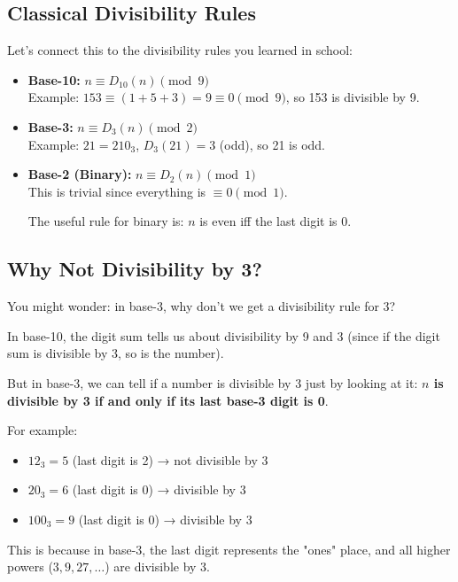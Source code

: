 \subsection{Classical Divisibility Rules}
\label{subsec:classical-rules}

Let's connect this to the divisibility rules you learned in school:

\begin{keyidea}
\begin{itemize}
\item \textbf{Base-10:} $n \equiv D_{10}(n) \pmod{9}$ \\
Example: $153 \equiv (1+5+3) = 9 \equiv 0 \pmod{9}$, so 153 is divisible by 9.

\item \textbf{Base-3:} $n \equiv D_3(n) \pmod{2}$ \\
Example: $21 = 210_3$, $D_3(21) = 3$ (odd), so 21 is odd.

\item \textbf{Base-2 (Binary):} $n \equiv D_2(n) \pmod{1}$\\
This is trivial since everything is $\equiv 0 \pmod{1}$.

The useful rule for binary is: $n$ is even iff the last digit is 0.
\end{itemize}
\end{keyidea}

\subsection{Why Not Divisibility by 3?}
\label{subsec:why-not-three}

You might wonder: in base-3, why don't we get a divisibility rule for 3?

\begin{intuitive}
In base-10, the digit sum tells us about divisibility by 9 and 3 (since if the digit sum is divisible by 3, so is the number).

But in base-3, we can tell if a number is divisible by 3 just by looking at it: \textbf{$n$ is divisible by 3 if and only if its last base-3 digit is 0}.

For example:
\begin{itemize}
\item $12_3 = 5$ (last digit is 2) → not divisible by 3
\item $20_3 = 6$ (last digit is 0) → divisible by 3
\item $100_3 = 9$ (last digit is 0) → divisible by 3
\end{itemize}

This is because in base-3, the last digit represents the "ones" place, and all higher powers ($3, 9, 27, \ldots$) are divisible by 3.
\end{intuitive}

